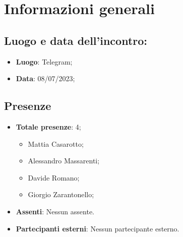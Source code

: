 \section{Informazioni generali}
    \subsection{Luogo e data dell'incontro:}
    \begin{itemize}
        \item \textbf{Luogo}: Telegram;
        \item \textbf{Data}: 08/07/2023;
    \end{itemize}
    \subsection{Presenze}
    \begin{itemize}
        \item \textbf{Totale presenze}: 4;
        \begin{itemize}
            \item Mattia Casarotto;
            \item Alessandro Massarenti;
            \item Davide Romano;
            \item Giorgio Zarantonello;
        \end{itemize}
        \item \textbf{Assenti}: Nessun assente.
        \item \textbf{Partecipanti esterni}: Nessun partecipante esterno.
    \end{itemize}